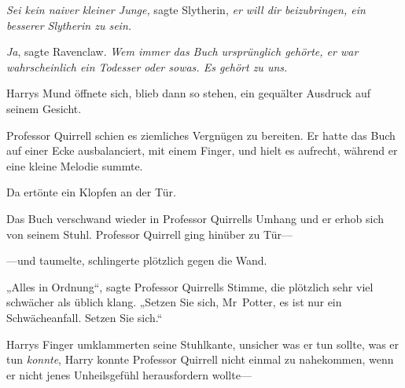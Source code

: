 \emph{Sei kein naiver kleiner Junge,} sagte Slytherin, \emph{er will dir beizubringen, ein besserer Slytherin zu sein.}

\emph{Ja}, sagte Ravenclaw. \emph{Wem immer das Buch ursprünglich gehörte, er war wahrscheinlich ein Todesser oder sowas. Es gehört zu uns.}

Harrys Mund öffnete sich, blieb dann so stehen, ein gequälter Ausdruck auf seinem Gesicht.

Professor Quirrell schien es ziemliches Vergnügen zu bereiten. Er hatte das Buch auf einer Ecke ausbalanciert, mit einem Finger, und hielt es aufrecht, während er eine kleine Melodie summte.

Da ertönte ein Klopfen an der Tür.

Das Buch verschwand wieder in Professor Quirrells Umhang und er erhob sich von seinem Stuhl. Professor Quirrell ging hinüber zu Tür—

—und taumelte, schlingerte plötzlich gegen die Wand.

„Alles in Ordnung“, sagte Professor Quirrells Stimme, die plötzlich sehr viel schwächer als üblich klang. „Setzen Sie sich, Mr~Potter, es ist nur ein Schwächeanfall. Setzen Sie sich.“%

Harrys Finger umklammerten seine Stuhlkante, unsicher was er tun sollte, was er tun \emph{konnte}, Harry konnte Professor Quirrell nicht einmal zu nahekommen, wenn er nicht jenes Unheilsgefühl herausfordern wollte—

